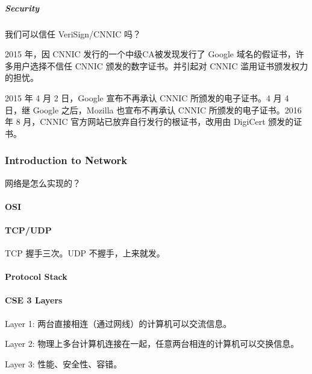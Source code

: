 \documentclass[
]{article}
\begin{document}
\hypertarget{header-n171}{%
\subparagraph{Security}\label{header-n171}}

我们可以信任 VeriSign/CNNIC 吗？

2015 年，因 CNNIC 发行的一个中级CA被发现发行了 Google
域名的假证书，许多用户选择不信任 CNNIC 颁发的数字证书。并引起对 CNNIC
滥用证书颁发权力的担忧。

2015 年 4 月 2 日，Google 宣布不再承认 CNNIC 所颁发的电子证书。4 月 4
日，继 Google 之后，Mozilla 也宣布不再承认 CNNIC 所颁发的电子证书。2016
年 8 月，CNNIC 官方网站已放弃自行发行的根证书，改用由 DigiCert
颁发的证书。

\hypertarget{header-n175}{%
\subsubsection{Introduction to Network}\label{header-n175}}

网络是怎么实现的？

\hypertarget{header-n177}{%
\paragraph{OSI}\label{header-n177}}

\hypertarget{header-n178}{%
\paragraph{TCP/UDP}\label{header-n178}}

TCP 握手三次。UDP 不握手，上来就发。

\hypertarget{header-n180}{%
\paragraph{Protocol Stack}\label{header-n180}}

\hypertarget{header-n181}{%
\paragraph{CSE 3 Layers}\label{header-n181}}

Layer 1: 两台直接相连（通过网线）的计算机可以交流信息。

Layer 2: 物理上多台计算机连接在一起，任意两台相连的计算机可以交换信息。

Layer 3: 性能、安全性、容错。
\end{document}
